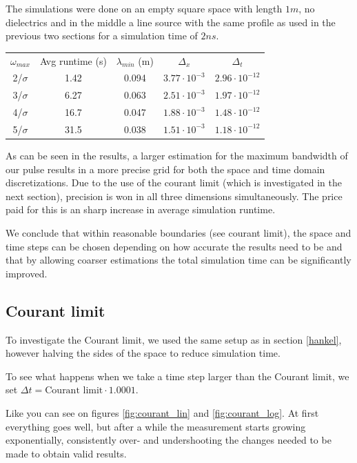 \documentclass[11pt, a4paper]{article}
\begin{document}
The simulations were done on an empty square space with length $1m$, no dielectrics and in the middle a line source with the same profile as used in the previous two sections for a simulation time of $2 ns$.

\begin{center}
\begin{tabular}{ c c c c c} 
 $\omega_{max}$ & Avg runtime (s) & $\lambda_{min}$ (m) & $\Delta_x$ & $\Delta_t$ \\
 2/$\sigma$ & 1.42 & 0.094 & $3.77\cdot10^{-3}$ & $2.96\cdot10^{-12}$\\ 
 3/$\sigma$ & 6.27 & 0.063 & $2.51\cdot10^{-3}$ & $1.97\cdot10^{-12}$\\ 
 4/$\sigma$ & 16.7 & 0.047 & $1.88\cdot10^{-3}$ & $1.48\cdot10^{-12}$\\ 
 5/$\sigma$ & 31.5 & 0.038 & $1.51\cdot10^{-3}$ & $1.18\cdot10^{-12}$
\end{tabular}
\end{center}

As can be seen in the results, a larger estimation for the maximum bandwidth of our pulse results in a more precise grid for both the space and time domain discretizations. Due to the use of the courant limit (which is investigated in the next section), precision is won in all three dimensions simultaneously. The price paid for this is an sharp increase in average simulation runtime.

We conclude that within reasonable boundaries (see courant limit), the space and time steps can be chosen depending on how accurate the results need to be and that by allowing coarser estimations the total simulation time can be significantly improved.

\subsection{Courant limit}

To investigate the Courant limit, we used the same setup as in section \ref{hankel}, however halving the sides of the space to reduce simulation time. 

To see what happens when we take a time step larger than the Courant limit, we set $\Delta t = \text{Courant limit} \cdot 1.0001$.

Like you can see on figures \ref{fig:courant_lin} and \ref{fig:courant_log}. At first everything goes well, but after a while the measurement starts growing exponentially, consistently over- and undershooting the changes needed to be made to obtain valid results.
\end{document}
